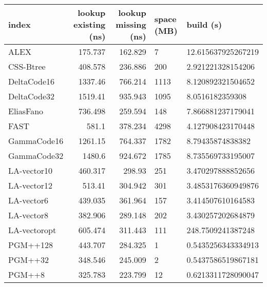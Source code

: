 \begin{tabular}{lrrll}
\hline
 index             &   lookup existing (ns) &   lookup missing (ns) & space (MB)   & build (s)            \\
\hline
 ALEX              &                175.737 &              162.829  & 7            & 12.615637925267219   \\
 CSS-Btree         &                408.578 &              236.886  & 200          & 2.921221328154206    \\
 DeltaCode16       &               1337.46  &              766.214  & 1113         & 8.120892321504652    \\
 DeltaCode32       &               1519.41  &              935.943  & 1095         & 8.0516182359308      \\
 EliasFano         &                736.498 &              259.594  & 148          & 7.866881237179041    \\
 FAST              &                581.1   &              378.234  & 4298         & 4.127908423170448    \\
 GammaCode16       &               1261.15  &              764.337  & 1782         & 8.79435874838382     \\
 GammaCode32       &               1480.6   &              924.672  & 1785         & 8.735569733195007    \\
 LA-vector10       &                460.317 &              298.93   & 251          & 3.470297888852656    \\
 LA-vector12       &                513.41  &              304.942  & 301          & 3.4853176360949876   \\
 LA-vector6        &                439.035 &              361.964  & 157          & 3.414507610164583    \\
 LA-vector8        &                382.906 &              289.148  & 202          & 3.430257202684879    \\
 LA-vectoropt      &                605.474 &              311.443  & 111          & 248.7509241387248    \\
 PGM++128          &                443.707 &              284.325  & 1            & 0.5435256343334913   \\
 PGM++32           &                348.546 &              245.009  & 2            & 0.5437586519867181   \\
 PGM++8            &                325.783 &              223.799  & 12           & 0.6213311728090047   \\

\end{tabular}
